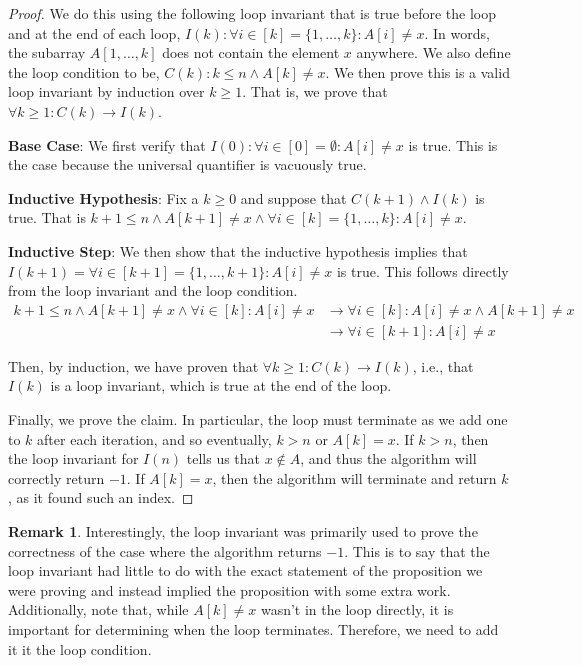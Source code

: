 \documentclass{article}
\newcommand{\ra}{\rightarrow}
\theoremstyle{plain}
\theoremstyle{definition}
\newtheorem{remark}{Remark}
\begin{document}
\begin{proof}
    We do this using the following loop invariant that is true before the loop and at the end of each loop, \(I(k) : \forall i \in [k] = \{1, \dotsc, k\} : A[i] \neq x\). In words, the subarray \(A[1,\dotsc,k]\) does not contain the element \(x\) anywhere. We also define the loop condition to be, \(C(k) : k \leq n \land A[k] \neq x\). We then prove this is a valid loop invariant by induction over \(k \geq 1\). That is, we prove that \(\forall k \geq 1 : C(k) \ra I(k)\).
    
    \textbf{Base Case}: We first verify that \(I(0) : \forall i \in [0] = \emptyset : A[i] \neq x\) is true. This is the case because the universal quantifier is vacuously true.

    \textbf{Inductive Hypothesis}: Fix a \(k \geq 0\) and suppose that \(C(k+1) \land I(k)\) is true. That is \(k+1 \leq n \land A[k+1] \neq x \land \forall i \in [k] = \{1, \dotsc, k\} : A[i] \neq x\).

    \textbf{Inductive Step}: We then show that the inductive hypothesis implies that \(I(k+1) = \forall i \in [k+1] = \{1, \dotsc, k+1\} : A[i] \neq x\) is true. This follows directly from the loop invariant and the loop condition.
    \begin{align*}
        k+1 \leq n \land A[k+1] \neq x \land \forall i \in [k] : A[i] \neq x &\rightarrow \forall i \in [k] : A[i] \neq x \land A[k+1] \neq x \\
        &\rightarrow \forall i \in [k+1] : A[i] \neq x
    \end{align*}

    Then, by induction, we have proven that \(\forall k \geq 1 : C(k) \ra I(k)\), i.e., that \(I(k)\) is a loop invariant, which is true at the end of the loop. 

    Finally, we prove the claim. In particular, the loop must terminate as we add one to \(k\) after each iteration, and so eventually, \(k > n\) or \(A[k] = x\). If \(k > n\), then the loop invariant for \(I(n)\) tells us that \(x \notin A\), and thus the algorithm will correctly return \(-1\). If \(A[k] = x\), then the algorithm will terminate and return \(k\), as it found such an index.
\end{proof}

\begin{remark}
    Interestingly, the loop invariant was primarily used to prove the correctness of the case where the algorithm returns \(-1\). This is to say that the loop invariant had little to do with the exact statement of the proposition we were proving and instead implied the proposition with some extra work. Additionally, note that, while \(A[k] \neq x\) wasn't in the loop directly, it is important for determining when the loop terminates. Therefore, we need to add it it the loop condition. 
\end{remark}
\end{document}
